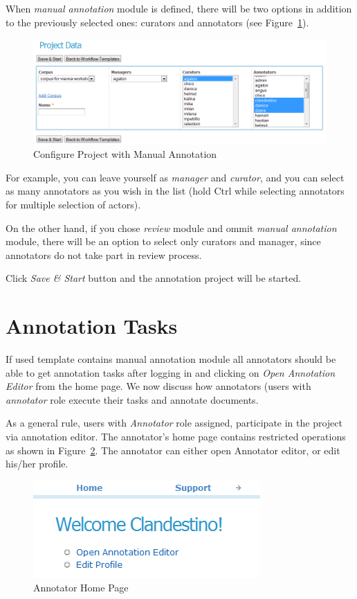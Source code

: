 When \emph{manual annotation} module is defined, there will be two options in
addition to the previously selected ones: curators and annotators
(see Figure~\ref{fig:projectdatamanual}).
\begin{figure}[htb]
\centering
\includegraphics[scale=0.34]{projectdatamanual}
\caption{Configure Project with Manual Annotation}
\label{fig:projectdatamanual}
\end{figure}
For example, you can leave yourself as \emph{manager} and \emph{curator}, and
you can select as many annotators as you wish in the list (hold Ctrl while
selecting annotators for multiple selection of actors).

On the other hand, if you chose \emph{review} module and ommit \emph{manual
annotation} module, there will be an option to select only curators and manager,
since annotators do not take part in review process.

Click \emph{Save \& Start} button and the annotation project will be started.

\section{Annotation Tasks}\label{section:annotation-tasks}

If used template contains manual annotation module all annotators should be
able to get annotation tasks after logging in and clicking on \emph{Open Annotation Editor} from the home page.
We now discuss how annotators (users with \emph{annotator} role execute their
tasks and annotate documents.

As a general rule, users with \emph{Annotator} role assigned, participate in
the project via annotation editor. The annotator's home page contains restricted
operations as shown in Figure~\ref{fig:annotatorhomepage}. The annotator can
either open Annotator editor, or edit his/her profile.
\begin{figure}[htb]
\centering
\includegraphics[scale=0.4]{annotatorhomepage}
\caption{Annotator Home Page}
\label{fig:annotatorhomepage}
\end{figure}

